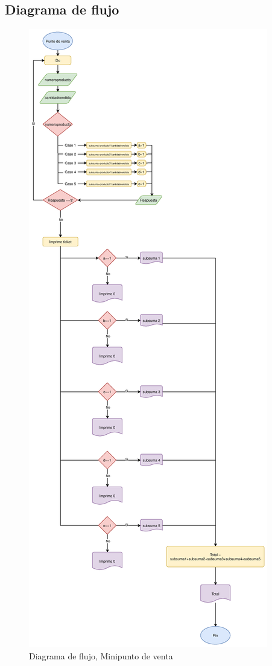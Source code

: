 \documentclass[letter,twocolumn]{revtex4}
\begin{document}
\subsection{Diagrama de flujo}
\begin{figure}[ht]
         \renewcommand\figurename{Fig.}
         \includegraphics[scale=0.25]{Images/Diagrama.eps}
         \caption{Diagrama de flujo, Minipunto de venta}
\end{figure}
\end{document}
